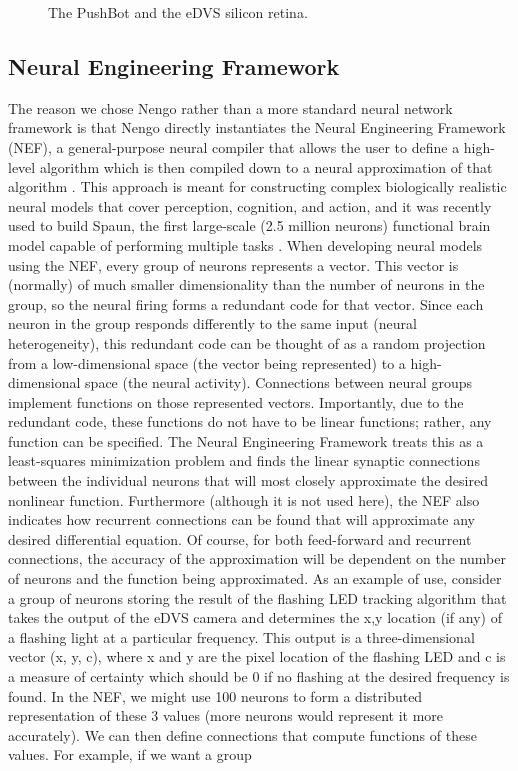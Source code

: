 \documentclass[conference]{IEEEtran}
\begin{document}
\begin{figure}[!t]
\centering
\caption{The PushBot and the eDVS silicon retina.}
\label{fig_sim}
\end{figure}

\subsection{Neural Engineering Framework}
The reason we chose Nengo rather than a more standard neural network framework is that Nengo \cite{bekolay_nengo2014} directly instantiates the Neural Engineering Framework (NEF), a general-purpose neural compiler that allows the user to define a high-level algorithm which is then compiled down to a neural approximation of that algorithm \cite{eliasmith2004neural}. This approach is meant for constructing complex biologically realistic neural models that cover perception, cognition, and action, and it was recently used to build Spaun, the first large-scale (2.5 million neurons) functional brain model capable of performing multiple tasks  \cite{eliasmith_largescale_2012}. When developing neural models using the NEF, every group of neurons represents a vector. This vector is (normally) of much smaller dimensionality than the number of neurons in the group, so the neural firing forms a redundant code for that vector. Since each neuron in the group responds differently to the same input (neural heterogeneity), this redundant code can be thought of as a random projection from a low-dimensional space (the vector being represented) to a high-dimensional space (the neural activity). Connections between neural groups implement functions on those represented vectors. Importantly, due to the redundant code, these functions do not have to be linear functions; rather, any function can be specified. The Neural Engineering Framework treats this as a least-squares minimization problem and finds the linear synaptic connections between the individual neurons that will most closely approximate the desired nonlinear function. Furthermore (although it is not used here), the NEF also indicates how recurrent connections can be found that will approximate any desired differential equation. Of course,
for both feed-forward and recurrent connections, the accuracy of the approximation will be dependent on the number of neurons and the function being approximated. As an example of use, consider a group of neurons storing the result of the flashing LED tracking algorithm that takes the output of the eDVS camera and determines the x,y location (if any) of a flashing light at a particular frequency. This output is a three-dimensional vector (x, y, c), where x and y are the pixel location of the flashing LED and c is a measure of certainty which should be 0 if no flashing at the desired frequency is found. In the NEF, we might use 100 neurons to form a distributed representation of these 3 values (more neurons would represent it more accurately). We can then define connections that compute functions of these values. For example, if we want a group
\end{document}
